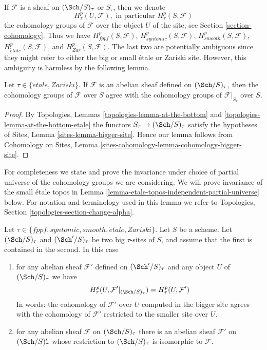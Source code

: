 \medskip\noindent
If $\mathcal{F}$ is a sheaf on $(\Sch/S)_\tau$ or $S_\tau$, then
we denote
$$
H^p_\tau(U, \mathcal{F}), \text{ in particular }
H^p_\tau(S, \mathcal{F})
$$
the cohomology groups of $\mathcal{F}$ over the object $U$ of the site, see
Section \ref{section-cohomology}. Thus we have
$H^p_{fppf}(S, \mathcal{F})$,
$H^p_{syntomic}(S, \mathcal{F})$,
$H^p_{smooth}(S, \mathcal{F})$,
$H^p_{\acute{e}tale}(S, \mathcal{F})$, and
$H^p_{Zar}(S, \mathcal{F})$. The last two are potentially ambiguous since
they might refer to either the big or small \'etale or Zariski site. However,
this ambiguity is harmless by the following lemma.

\begin{lemma}
\label{lemma-compare-cohomology-big-small}
Let $\tau \in \{\acute{e}tale, Zariski\}$.
If $\mathcal{F}$ is an abelian sheaf defined on
$(\Sch/S)_\tau$, then
the cohomology groups of $\mathcal{F}$ over $S$ agree with the cohomology
groups of $\mathcal{F}|_{S_\tau}$ over $S$.
\end{lemma}

\begin{proof}
By
Topologies, Lemmas \ref{topologies-lemma-at-the-bottom} and
\ref{topologies-lemma-at-the-bottom-etale}
the functors $S_\tau \to (\Sch/S)_\tau$
satisfy the hypotheses of
Sites, Lemma \ref{sites-lemma-bigger-site}.
Hence our lemma follows from
Cohomology on Sites, Lemma \ref{sites-cohomology-lemma-cohomology-bigger-site}.
\end{proof}

\noindent
For completeness we state and prove the invariance under choice of partial
universe of the cohomology groups we are considering. We will prove invariance
of the small \'etale topos in
Lemma \ref{lemma-etale-topos-independent-partial-universe} below.
For notation and terminology used in this lemma we refer to
Topologies, Section \ref{topologies-section-change-alpha}.

\begin{lemma}
\label{lemma-cohomology-enlarge-partial-universe}
Let $\tau \in \{fppf, syntomic, smooth, \acute{e}tale, Zariski\}$.
Let $S$ be a scheme.
Let $(\Sch/S)_\tau$ and $(\Sch'/S)_\tau$ be two
big $\tau$-sites of $S$, and assume that the first is contained in the second.
In this case
\begin{enumerate}
\item for any abelian sheaf $\mathcal{F}'$ defined on $(\Sch'/S)_\tau$ and
any object $U$ of $(\Sch/S)_\tau$ we have
$$
H^p_\tau(U, \mathcal{F}'|_{(\Sch/S)_\tau}) =
H^p_\tau(U, \mathcal{F}')
$$
In words: the cohomology of $\mathcal{F}'$ over $U$ computed in the bigger site
agrees with the cohomology of $\mathcal{F}'$ restricted to the smaller site
over $U$.
\item for any abelian sheaf $\mathcal{F}$ on $(\Sch/S)_\tau$ there is an
abelian sheaf $\mathcal{F}'$ on $(\Sch/S)_\tau'$ whose restriction to
$(\Sch/S)_\tau$ is isomorphic to $\mathcal{F}$.
\end{enumerate}
\end{lemma}


